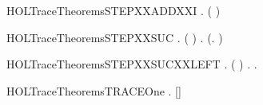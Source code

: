 \newcommand{\HOLTraceTheoremsSTEPXXADDXXEQN}{\UseVerbatim{HOLTraceTheoremsSTEPXXADDXXEQN}}
\begin{SaveVerbatim}{HOLTraceTheoremsSTEPXXADDXXI}
\HOLTokenTurnstile{} \HOLSymConst{\HOLTokenForall{}}    .     \HOLSymConst{\HOLTokenConj{}}     \HOLSymConst{\HOLTokenImp{}}   ( \HOLSymConst{\ensuremath{+}} ) 
\end{SaveVerbatim}
\newcommand{\HOLTraceTheoremsSTEPXXADDXXI}{\UseVerbatim{HOLTraceTheoremsSTEPXXADDXXI}}
\begin{SaveVerbatim}{HOLTraceTheoremsSTEPXXSUC}
\HOLTokenTurnstile{} \HOLSymConst{\HOLTokenForall{}}  .   ( )  \HOLSymConst{\HOLTokenEquiv{}} \HOLSymConst{\HOLTokenExists{}}. (\HOLSymConst{\HOLTokenExists{}}.  \HOLTokenTransBegin{}\HOLTokenTransEnd {}) \HOLSymConst{\HOLTokenConj{}}    
\end{SaveVerbatim}
\newcommand{\HOLTraceTheoremsSTEPXXSUC}{\UseVerbatim{HOLTraceTheoremsSTEPXXSUC}}
\begin{SaveVerbatim}{HOLTraceTheoremsSTEPXXSUCXXLEFT}
\HOLTokenTurnstile{} \HOLSymConst{\HOLTokenForall{}}  .   ( )  \HOLSymConst{\HOLTokenEquiv{}} \HOLSymConst{\HOLTokenExists{}}.     \HOLSymConst{\HOLTokenConj{}} \HOLSymConst{\HOLTokenExists{}}.  \HOLTokenTransBegin{}\HOLTokenTransEnd {}
\end{SaveVerbatim}
\newcommand{\HOLTraceTheoremsSTEPXXSUCXXLEFT}{\UseVerbatim{HOLTraceTheoremsSTEPXXSUCXXLEFT}}
\begin{SaveVerbatim}{HOLTraceTheoremsTRACEOne}
\HOLTokenTurnstile{} \HOLSymConst{\HOLTokenForall{}}  .  \HOLTokenTransBegin{}\HOLTokenTransEnd {} \HOLSymConst{\HOLTokenImp{}}   [] 
\end{SaveVerbatim}
